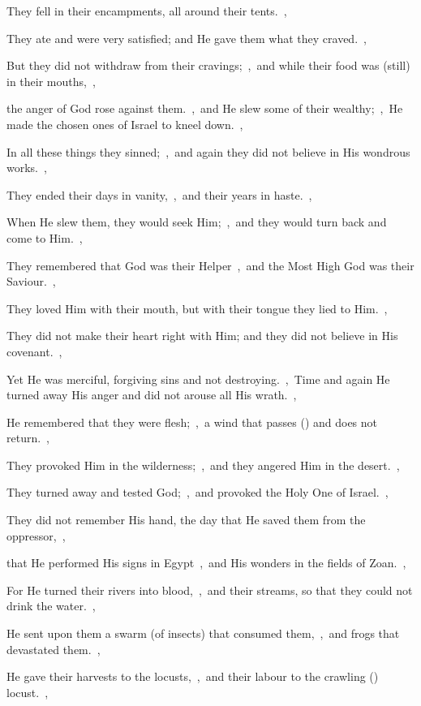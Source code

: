 \documentclass[12pt,twoside,a5paper]{article}
\begin{document}
\begin{normalparskip}
  They fell in their encampments, all around their tents.~\sep

  They ate and were very satisfied; and He gave them what they craved.~\sep

  But they did not withdraw from their cravings;~\sep\ and while their food was (still) in their mouths,~\sep

  the anger of God rose against them.~\sep\ and He slew some of their wealthy;~\sep\ He made the chosen ones of Israel to kneel down.~\sep

  In all these things they sinned;~\sep\ and again they did not believe in His wondrous works.~\sep

  They ended their days in vanity,~\sep\ and their years in haste.~\sep

  When He slew them, they would seek Him;~\sep\ and they would turn back and come to Him.~\sep

  They remembered that God was their Helper~\sep\ and the Most High God was their Saviour.~\sep

  They loved Him with their mouth, but with their tongue they lied to Him.~\sep

  They did not make their heart right with Him; and they did not believe in His covenant.~\sep

  Yet He was merciful, forgiving sins and not destroying.~\sep\ Time and again He turned away His anger and did not arouse all His wrath.~\sep

  He remembered that they were flesh;~\sep\ a wind that passes () and does not return.~\sep

  They provoked Him in the wilderness;~\sep\ and they angered Him in the desert.~\sep

  They turned away and tested God;~\sep\ and provoked the Holy One of Israel.~\sep

  They did not remember His hand, the day that He saved them from the oppressor,~\sep

  that He performed His signs in Egypt~\sep\ and His wonders in the fields of Zoan.~\sep

  For He turned their rivers into blood,~\sep\ and their streams, so that they could not drink the water.~\sep

  He sent upon them a swarm (of insects) that consumed them,~\sep\ and frogs that devastated them.~\sep

  He gave their harvests to the locusts,~\sep\ and their labour to the crawling () locust.~\sep


\end{normalparskip}
\end{document}
